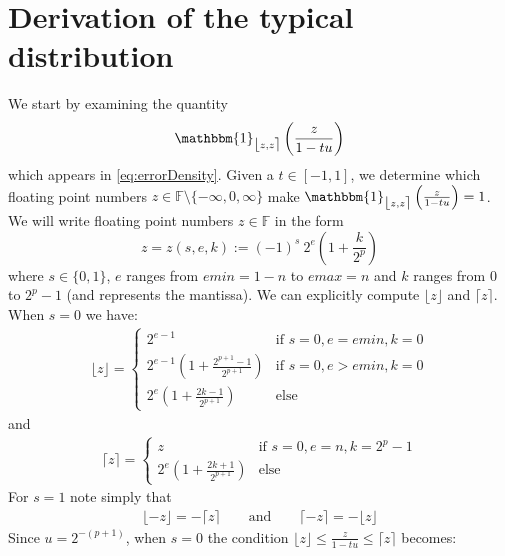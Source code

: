 \documentclass[10pt,conference]{IEEEtran}
\newcommand{\ceil}[1]{\lceil #1 \rceil}
\newcommand{\floor}[1]{\lfloor #1 \rfloor}
\newcommand{\fintvl}[1][x]{\mathlarger{\lfloor}#1,#1\mathlarger{\rceil}}
\newcommand{\F}{\mathbb{F}}
\newcommand{\one}{\mathbbm{1}}
\begin{document}



\appendix

\section*{Derivation of the typical distribution}

We start by examining the quantity
\[
\one_{\fintvl[z]}\left(\frac{z}{1-tu}\right)
\]
which appears in \cref{eq:errorDensity}. Given a $t\in\left[-1,1\right]$, we determine which floating point numbers $z\in\F\setminus\{-\infty,0,\infty\}$ make $\one_{\fintvl[z]}\left(\frac{z}{1-tu}\right)=1$. We will write floating point numbers $z\in\F$ in the form
\[
z=z(s,e,k):=(-1)^s ~ 2^e \left(1+\frac{k}{2^p}\right)
\]
where $s\in\{0,1\}$, $e$ ranges from $emin=1-n$ to $emax=n$ and $k$ ranges from 0 to $2^p-1$ (and represents the mantissa). We can explicitly compute $\floor{z}$ and $\ceil{z}$. When $s=0$ we have:
\begin{align*}
\floor{z}=
\begin{cases}
2^{e-1} & \text{if }s=0, e=emin, k=0\\
2^{e-1}\left(1+\frac{2^{p+1}-1}{2^{p+1}}\right) & \text{if }s=0, e>emin, k=0\\
2^e\left(1+\frac{2k-1}{2^{p+1}}\right) & \text{else}
\end{cases}
\end{align*}
and
\begin{align*}
\ceil{z}=\begin{cases}
z&\text{if }s=0, e=n, k=2^p-1\\
2^e\left(1+\frac{2k+1}{2^{p+1}}\right) & \text{else}
\end{cases}
\end{align*}
For $s=1$ note simply that
\begin{align}
\floor{-z}=-\ceil{z}\qquad\text{and}\qquad\ceil{-z}=-\floor{z}\label{eq:minz}
\end{align}
Since $u=2^{-(p+1)}$, when $s=0$ the condition $\floor{z}\leq \frac{z}{1-tu}\leq \ceil{z}$ becomes:
\end{document}
